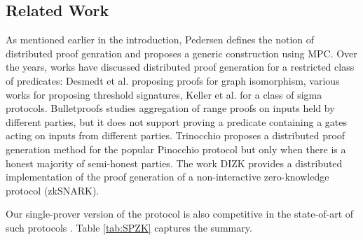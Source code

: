 \subsection{Related Work}\label{sec:relatedwork}
As mentioned earlier in the introduction, Pedersen \cite{Ped92} defines the notion of distributed proof genration and proposes a generic construction using MPC. Over the years, works have discussed distributed proof generation for a restricted class of predicates: Desmedt et al. \cite{DDB94} proposing proofs for graph isomorphism, various works \cite{King05, DDS, Desmedt2011} for proposing threshold signatures, Keller et al. \cite{EfficientTZ} for a class of sigma protocols. Bulletproofs \cite{bulletproofs} studies aggregation of range proofs on inputs held by different parties, but it does not support proving a predicate containing a gates acting on inputs from different parties.
Trinocchio \cite{trinocchio} proposes a distributed proof generation method for the popular Pinocchio protocol \cite{pinnochio_PHGR} but only when there is a honest majority of semi-honest parties. The work DIZK \cite{dizk} provides a distributed implementation of the proof generation of a non-interactive zero-knowledge protocol (zkSNARK).


Our single-prover version of the protocol is also competitive in the state-of-art of such protocols \cite{ligero, aurora, bulletproofs}. Table \ref{tab:SPZK} captures the summary.



